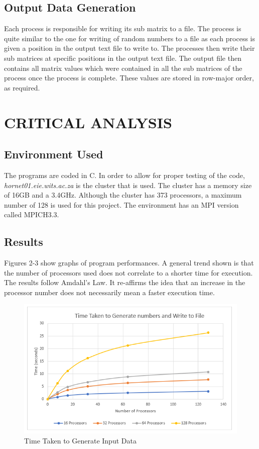 \documentclass[11pt,conference]{IEEEtran}
\begin{document}
\subsection{Output Data Generation}
\noindent
Each process is responsible for writing its sub matrix to a file. The process is quite similar to the one for writing of random numbers to a file as each process is given a position in the output text file to write to. The processes then write their sub matrices at specific positions in the output text file. The output file then contains all matrix values which were contained in all the sub matrices of the process once the process is complete. These values are stored in row-major order, as required.
\section{CRITICAL ANALYSIS}

\subsection{Environment Used}
\noindent
The programs are coded in C. In order to allow for proper testing of the code, {\sl hornet01.eie.wits.ac.za} is the cluster that is used. The cluster has a memory size of 16GB and a 3.4GHz. Although the cluster has 373 processors, a maximum number of 128 is used for this project. The environment has an MPI version called MPICH3.3.


\subsection{Results}
\noindent
Figures 2-3 show graphs of program performances. A general trend shown is that the number of processors used does not correlate to a shorter time for execution. The results follow Amdahl's Law. It re-affirms the idea that an increase in the processor number does not necessarily mean a faster execution time.

\begin{figure}[h!]
    \centering
    \includegraphics[scale=0.52]{report/input.PNG}
    \caption{Time Taken to Generate Input Data}
    \label{7}
\end{figure}
\end{document}
